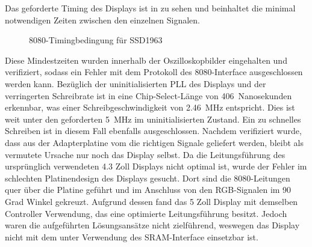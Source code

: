 \newpage
Das geforderte Timing des Displays ist in  zu sehen und beinhaltet die minimal notwendigen Zeiten zwischen den einzelnen Signalen.
\begin{figure}[htp]
	\centering
{}
	\caption{8080-Timingbedingung für SSD1963}
	\label{fig:ssd1963_timing_constraints}
\end{figure}
Diese Mindestzeiten wurden innerhalb der Oszilloskopbilder eingehalten und verifiziert, sodass ein Fehler mit dem Protokoll des 8080-Interface ausgeschlossen werden kann. Bezüglich der uninitialisierten PLL des Displays und der verringerten Schreibrate ist in  eine Chip-Select-Länge von 406~Nanosekunden erkennbar, was einer Schreibgeschwindigkeit von 2.46~MHz entspricht. Dies ist weit unter den geforderten 5~MHz im uninitialisierten Zustand. Ein zu schnelles Schreiben ist in diesem Fall ebenfalls ausgeschlossen. Nachdem verifiziert wurde, dass aus der Adapterplatine vom  die richtigen Signale geliefert werden, bleibt als vermutete Ursache nur noch das Display selbst. Da die Leitungsführung des ursprünglich verwendeten 4.3 Zoll Displays nicht optimal ist, wurde der Fehler im schlechten Platinendesign des Displays gesucht.
Dort sind die 8080-Leitungen quer über die Platine geführt und im Anschluss von den RGB-Signalen im 90 Grad Winkel gekreuzt. Aufgrund dessen fand das 5 Zoll Display mit demselben Controller Verwendung, das eine optimierte Leitungsführung besitzt. Jedoch waren die aufgeführten Lösungsansätze nicht zielführend, weswegen das Display nicht mit dem  unter Verwendung des SRAM-Interface einsetzbar ist.